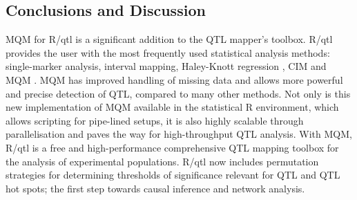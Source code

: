 \subsection{Conclusions and Discussion}
MQM for R/qtl is a significant addition to the QTL mapper's toolbox. R/qtl provides the user 
with the most frequently used statistical analysis methods: single-marker analysis, interval 
mapping, Haley-Knott regression \cite{Haley:1992}, CIM \cite{Zeng:1994} and MQM \cite{Jansen:1994a}. 
MQM has improved handling of missing data and allows more powerful and precise detection of QTL, 
compared to many other methods. Not only is this new implementation of MQM available in the
statistical R environment, which allows scripting for pipe-lined setups, it is also highly 
scalable through parallelisation and paves the way for high-throughput QTL analysis. With MQM, 
R/qtl is a free and high-performance comprehensive QTL mapping toolbox for the analysis of 
experimental populations. R/qtl now includes permutation strategies for determining thresholds 
of significance relevant for QTL and QTL hot spots; the first step towards causal inference and
network analysis.

